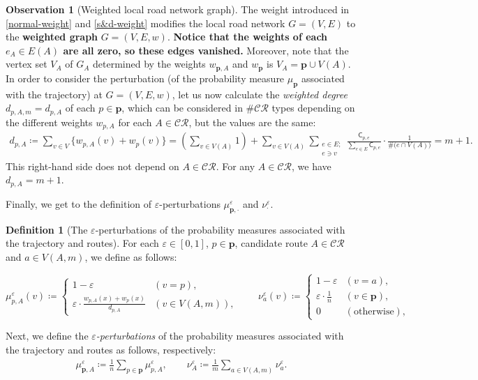 \documentclass{article}
\numberwithin{equation}{section}
\theoremstyle{definition}
\newtheorem{definition}{Definition}[section]
\newtheorem{observation}[observation]{Observation}
\newcommand{\CR}{\mathcal{CR}}
\newcommand{\cc}{\mathsf{C}}
\newcommand{\eps}{\varepsilon} %
\def\:={\coloneqq} %
\begin{document}
\begin{observation}[Weighted local road network graph]
The weight introduced in \autoref{normal-weight} and \autoref{s&d-weight} modifies the local road network $G=(V,E)$ to the \textbf{weighted graph} $G=(V,E,w)$.
\textbf{Notice that the weights of each $e_A\in E(A)$ are all zero, so these edges vanished.}
Moreover, note that the vertex set $V_A$ of $G_A$ determined by the weights $w_{\mathbf{p},A}$ and $w_\mathbf{p}$ is $V_A=\mathbf{p}\cup V(A)$.
In order to consider the perturbation (of the probability measure $\mu_{\mathbf{p}}$ associated with the trajectory) at $G=(V,E,w)$, let us now calculate the \emph{weighted degree} $d_{p,A,m}=d_{p,A}$ of each $p\in\mathbf{p}$, which can be considered in $\#\CR$ types depending on the different weights $w_{p,A}$ for each $A\in\CR$, but the values are the same:
\begin{align*}
    d_{p,A} \:= 
    \sum_{v\in V} \big\{ w_{p,A}(v)+w_p(v) \big\} 
    = \left(\sum_{v\in V(A)}1\right) + 
    \sum_{v\in V(A)} \sum_{{\substack{e\in E;\\e\ni v}}} \frac{\cc_{p,e}}{\sum_{e\in E}\cc_{p,e}}\cdot\frac{1}{\#\big(e\cap V(A)\big)} 
    = m+1.
\end{align*}
This right-hand side does not depend on $A\in\CR$. 
For any $A\in\CR$, we have $d_{p,A}=m+1$.
\end{observation}

Finally, we get to the definition of $\eps$-perturbations $\mu_{\mathbf{p},\cdot}^\eps$ and $\nu_\cdot^\eps$.

\begin{definition}[The $\eps$-perturbations of the probability measures associated with the trajectory and routes]
For each $\eps\in[0,1]$, $p\in\mathbf{p}$, candidate route $A\in\CR$ and $a\in V(A,m)$, we define as follows:
\begin{center} \vspace{-4mm}
\[ \mu_{p,A}^\eps(v) \:= \left.
\begin{cases}
1-\eps & (v=p),   \\
\eps\cdot\frac{w_{p,A}(x)+w_p(x)}{d_{p,A}} & (v\in V(A,m)), 
\end{cases}
\right.
\qquad
\nu_a^\eps(v) \:= 
\begin{cases}
1-\eps & (v=a),   \\
\eps\cdot\frac{1}{n} & (v\in\mathbf{p}),   \\
0 & (\text{otherwise}), 
\end{cases}\]
\end{center} 
Next, we define the \emph{$\eps$-perturbations} of the probability measures associated with the trajectory and routes as follows, respectively:
\begin{align*}
    \mu_{\mathbf{p},A}^\eps\:=\frac{1}{n}\sum_{p\in\mathbf{p}}\mu_{p,A}^\eps, \qquad
    \nu_A^\eps\:=\frac{1}{m}\sum_{a\in V(A,m)}\nu_a^\eps.
\end{align*}
\end{definition}
\end{document}
